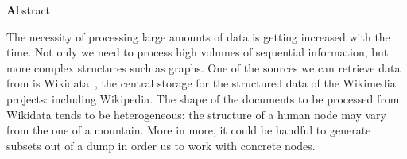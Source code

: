 \thispagestyle{empty}

\vspace*{\fill}

\begin{center}
	\large
	{\textbf Abstract}\\[5mm]
\end{center}
The necessity of processing large amounts of data is getting increased with the time. Not only we need to process high volumes of sequential information, but more complex structures such as graphs. One of the sources we can retrieve data from is Wikidata~\cite{web:wikidata}, the central storage for the structured data of the Wikimedia projects: including Wikipedia. The shape of the documents to be processed from Wikidata tends to be heterogeneous: the structure of a human node may vary from the one of a mountain. More in more, it could be handful to generate subsets out of a dump in order us to work with concrete nodes.

\vspace*{\fill}